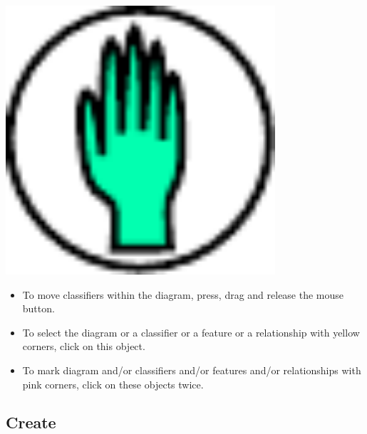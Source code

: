 \includegraphics[width=10cm]{../../gui/source/resources/tool_edit.pdf}
\begin{itemize}
\item To move classifiers within the diagram, press, drag and release the mouse button.
\item To select the diagram or a classifier or a feature or a relationship with yellow corners, click on this object.
\item To mark diagram and/or classifiers and/or features and/or relationships with pink corners, click on these objects twice.
\end{itemize}

\subsection{Create}

